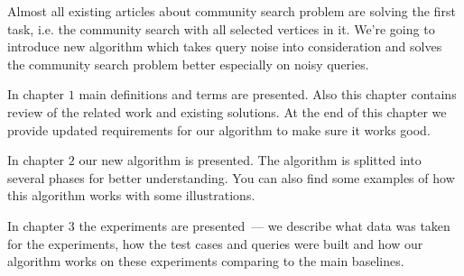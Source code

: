 Almost all existing articles about community search problem are solving the first task, i.e. the community search with all selected vertices in it. We're going to introduce new algorithm which takes query noise into consideration and solves the community search problem better especially on noisy queries.


In chapter $1$ main definitions and terms are presented. Also this chapter contains review of the related work and existing solutions. At the end of this chapter we provide updated requirements for our algorithm to make sure it works good.

In chapter $2$ our new algorithm is presented. The algorithm is splitted into several phases for better understanding. You can also find some examples of how this algorithm works with some illustrations.

In chapter $3$ the experiments are presented~--- we describe what data was taken for the experiments, how the test cases and queries were built and how our algorithm works on these experiments comparing to the main baselines.

